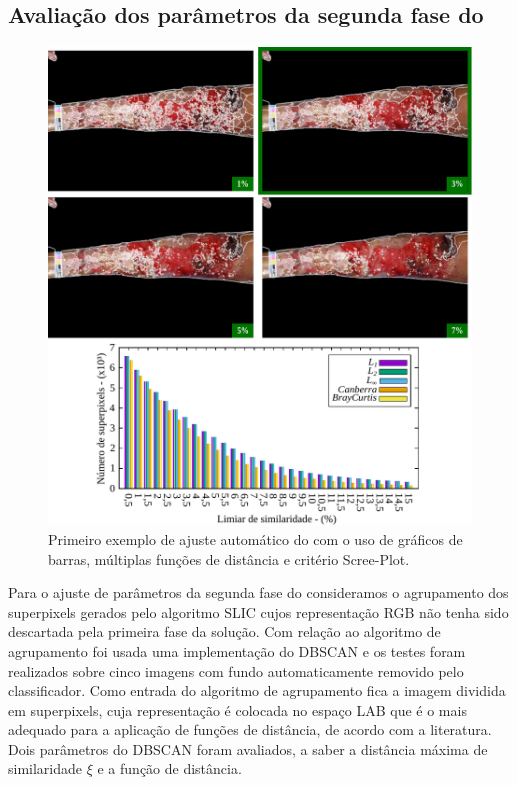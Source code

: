 \subsection{Avaliação dos parâmetros da segunda fase do \system} \label{sec:exp_dbcscan_2}

\begin{figure}[!b]
\centering
\includegraphics[scale=.93]{_fig/res1.pdf}
\caption[Primeiro exemplo de ajuste automático do \system com o uso de gráficos de barras e critério Scree-Plot.]{Primeiro exemplo de ajuste automático do \system com o uso de gráficos de barras, múltiplas funções de distância e critério Scree-Plot.}
\label{fig:expto_dbscan}
\end{figure}

Para o ajuste de parâmetros da segunda fase do \system consideramos o agrupamento dos superpixels gerados pelo algoritmo SLIC cujos representação RGB não tenha sido descartada pela primeira fase da solução.
Com relação ao algoritmo de agrupamento foi usada uma implementação do DBSCAN e os testes foram realizados sobre cinco imagens com fundo automaticamente removido pelo classificador.
Como entrada do algoritmo de agrupamento fica a imagem dividida em superpixels, cuja representação é colocada no espaço LAB que é o mais adequado para a aplicação de funções de distância, de acordo com a literatura.
Dois parâmetros do DBSCAN foram avaliados, a saber a distância máxima de similaridade $\xi$ e a função de distância.


